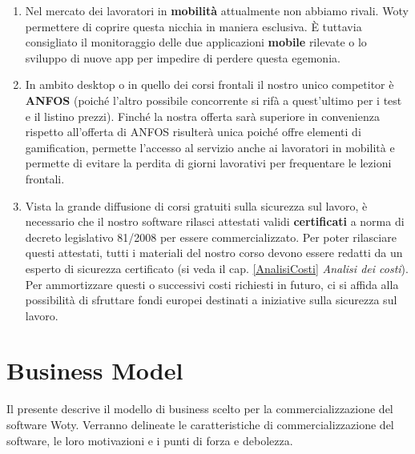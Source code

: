 \begin{enumerate}
	\item Nel mercato dei lavoratori in \textbf{mobilità} attualmente non abbiamo rivali. Woty permettere di coprire questa nicchia in maniera esclusiva. È tuttavia consigliato il monitoraggio delle due applicazioni \textbf{mobile} rilevate o lo sviluppo di nuove app per impedire di perdere questa egemonia.
	
	\item In ambito desktop o in quello dei corsi frontali il nostro unico competitor è \textbf{ANFOS} (poiché l'altro possibile concorrente si rifà a quest'ultimo per i test e il listino prezzi). Finché la nostra offerta sarà superiore in convenienza rispetto all'offerta di ANFOS risulterà unica poiché offre elementi di gamification, permette l'accesso al servizio anche ai lavoratori in mobilità e permette di evitare la perdita di giorni lavorativi per frequentare le lezioni frontali.
	
	\item Vista la grande diffusione di corsi gratuiti sulla sicurezza sul lavoro, è necessario che il nostro software rilasci attestati validi \textbf{certificati} a norma di decreto legislativo 81/2008 per essere commercializzato.
Per poter rilasciare questi attestati, tutti i materiali del nostro corso devono essere redatti da un esperto di sicurezza certificato (si veda il cap. \ref{AnalisiCosti} \textit{Analisi dei costi}).\\
Per ammortizzare questi o successivi costi richiesti in futuro, ci si affida alla possibilità di sfruttare fondi europei destinati a iniziative sulla sicurezza sul lavoro.

\end{enumerate}








\chapter{Business Model}

Il presente descrive il modello di business scelto per la commercializzazione del software Woty. Verranno delineate le caratteristiche di commercializzazione del software, le loro motivazioni e i punti di forza e debolezza.

